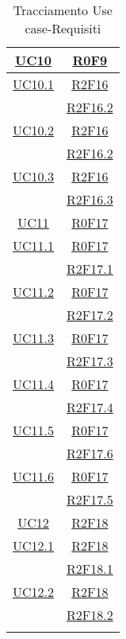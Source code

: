 \begin{longtable}{|c|c|}
\hline
\hyperlink{UC10}{UC10} & \hyperlink{R0F9}{R0F9}\\
\hline
\hyperlink{UC10.1}{UC10.1} & \hyperlink{R2F16}{R2F16}\\
& \hyperlink{R2F16.2}{R2F16.2}\\
\hline
\hyperlink{UC10.2}{UC10.2} & \hyperlink{R2F16}{R2F16}\\
& \hyperlink{R2F16.2}{R2F16.2}\\
\hline
\hyperlink{UC10.3}{UC10.3} & \hyperlink{R2F16}{R2F16}\\
& \hyperlink{R2F16.3}{R2F16.3}\\
\hline
\hyperlink{UC11}{UC11} & \hyperlink{R0F17}{R0F17}\\
\hline
\hyperlink{UC11.1}{UC11.1} & \hyperlink{R0F17}{R0F17}\\
& \hyperlink{R2F17.1}{R2F17.1}\\
\hline
\hyperlink{UC11.2}{UC11.2} & \hyperlink{R0F17}{R0F17}\\
& \hyperlink{R2F17.2}{R2F17.2}\\
\hline
\hyperlink{UC11.3}{UC11.3} & \hyperlink{R0F17}{R0F17}\\
& \hyperlink{R2F17.3}{R2F17.3}\\
\hline
\hyperlink{UC11.4}{UC11.4} & \hyperlink{R0F17}{R0F17}\\
& \hyperlink{R2F17.4}{R2F17.4}\\
\hline
\hyperlink{UC11.5}{UC11.5} & \hyperlink{R0F17}{R0F17}\\
& \hyperlink{R2F17.6}{R2F17.6}\\
\hline
\hyperlink{UC11.6}{UC11.6} & \hyperlink{R0F17}{R0F17}\\
& \hyperlink{R2F17.5}{R2F17.5}\\
\hline
\hyperlink{UC12}{UC12} & \hyperlink{R2F18}{R2F18}\\
\hline
\hyperlink{UC12.1}{UC12.1} & \hyperlink{R2F18}{R2F18}\\
& \hyperlink{R2F18.1}{R2F18.1}\\
\hline
\hyperlink{UC12.2}{UC12.2} & \hyperlink{R2F18}{R2F18}\\
& \hyperlink{R2F18.2}{R2F18.2}\\
\hline
\caption[Tracciamento Use case-Requisiti]{Tracciamento Use case-Requisiti}
\label{tabella:requi-usecase}
\end{longtable}
\clearpage
